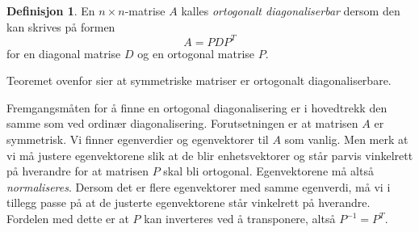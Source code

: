 \documentclass[11pt]{article}
\theoremstyle{definition}
\newtheorem{mindef}{Definisjon}[section]
\newenvironment{fmindef}
{\begin{mdframed}[style=minstil]\begin{mindef}}
		{\end{mindef}\end{mdframed}}
\theoremstyle{definition}
\theoremstyle{definition}
\theoremstyle{definition}
\theoremstyle{definition}
\theoremstyle{definition}
\begin{document}
		\begin{fmindef}
		En \(n \times n\)-matrise \(A\) kalles \textit{ortogonalt diagonaliserbar} dersom den kan skrives på formen \[A=PDP^T\]
		for en diagonal matrise \(D\) og en ortogonal matrise \(P\).
		\end{fmindef}
		
		{\flushleft Teoremet ovenfor sier at symmetriske matriser er ortogonalt diagonaliserbare.}
		
		Fremgangsmåten for å finne en ortogonal diagonalisering er i hovedtrekk den samme som ved ordinær diagonalisering. Forutsetningen er at matrisen \(A\) er symmetrisk. Vi finner egenverdier og egenvektorer til \(A\) som vanlig. Men merk at vi må justere egenvektorene slik at de blir enhetsvektorer og står parvis vinkelrett på hverandre for at matrisen \(P\) skal bli ortogonal. Egenvektorene må altså \textit{normaliseres}. Dersom det er flere egenvektorer med samme egenverdi, må vi i tillegg passe på at de justerte egenvektorene står vinkelrett på hverandre. Fordelen med dette er at \(P\) kan inverteres ved å transponere, altså \(P^{-1}=P^T\).
		
		\newpage
		
\end{document}
